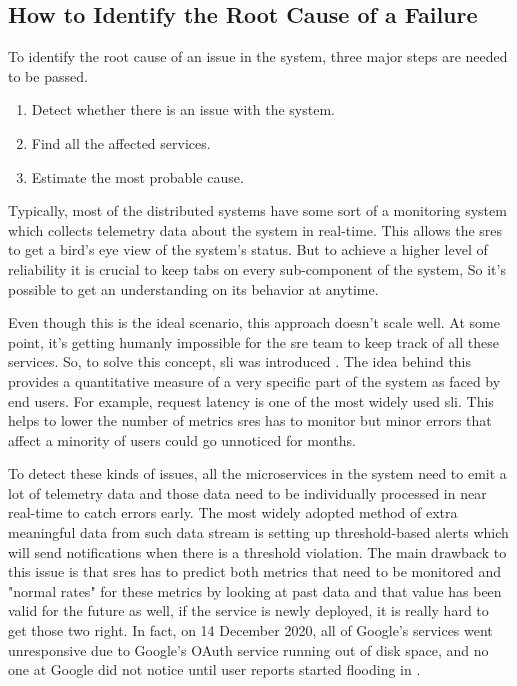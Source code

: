 \subsection{How to Identify the Root Cause of a Failure}\label{sec:how-root-cause}


To identify the root cause of an issue in the system, three major steps are needed to be passed.
\begin{enumerate}
\item Detect whether there is an issue with the system.
\item Find all the affected services.
\item Estimate the most probable cause.
\end{enumerate}

Typically, most of the distributed systems have some sort of a monitoring system which collects telemetry data about the system in real-time. This allows the \acp{sre} to get a bird's eye view of the system's status. But to achieve a higher level of reliability it is crucial to keep tabs on every sub-component of the system, So it's possible to get an understanding on its behavior at anytime. 

Even though this is the ideal scenario, this approach doesn't scale well. At some point, it's getting humanly impossible for the \ac{sre} team to keep track of all these services. So, to solve this concept, \ac{sli} was introduced \citep{beyer2016site}. The idea behind this provides a quantitative measure of a very specific part of the system as faced by end users. For example, request latency is one of the most widely used \ac{sli}. This helps to lower the number of metrics \acp{sre} has to monitor but minor errors that affect a minority of users could go unnoticed for months. 

To detect these kinds of issues, all the microservices in the system need to emit a lot of telemetry data and those data need to be individually processed in near real-time to catch errors early. The most widely adopted method of extra meaningful data from such data stream is setting up threshold-based alerts which will send notifications when there is a threshold violation. The main drawback to this issue is that \acp{sre} has to predict both metrics that need to be monitored and "normal rates" for these metrics by looking at past data and that value has been valid for the future as well, if the service is newly deployed, it is really hard to get those two right. In fact, on 14 December 2020, all of Google's services went unresponsive due to Google's OAuth service running out of disk space, and no one at Google did not notice until user reports started flooding in \citep{Googleoutage:online}. 

